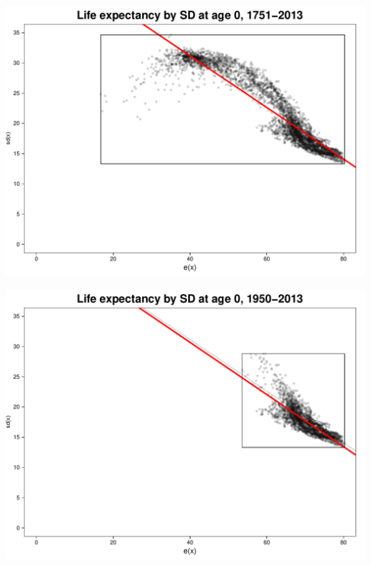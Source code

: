 \documentclass[xcolor={dvipsnames}]{beamer}
\begin{document}
\begin{frame}
		
			\begin{center}
		\includegraphics[scale=.53]{Figures/Fig1}

				\end{center}
			
\end{frame}


\begin{frame}
		
			\begin{center}
		\includegraphics[scale=.53]{Figures/Fig2}
				\end{center}
			
\end{frame}
\end{document}

